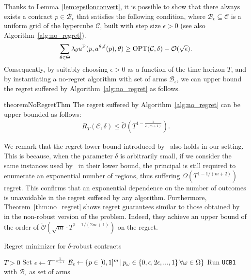Thanks to Lemma~\ref{lem:epsilonconvert}, it is possible to show that there always exists a contract $p \in \mathcal{B}_{\epsilon}$ that satisfies the following condition, where $\mathcal{B}_{\epsilon} \subseteq \mathcal{C}$ is a uniform grid of the hypercube $\mathcal{C}$, built with step size $\epsilon > 0$ (see also Algorithm~\ref{alg:no_regret}).
%
\[ \sum_{\theta \in \Theta} \lambda_\theta  u^{\textnormal{P}}(p,a^{\theta,\delta}(p),\theta) \ge \textnormal{OPT}(\mathcal{C},\delta) - \mathcal{O}( \sqrt{\epsilon}).\]
%
Consequently, by suitably choosing $\epsilon > 0$ as a function of the time horizon $T$, and by instantiating a no-regret algorithm with set of arms $\mathcal{B}_{\epsilon}$, we can upper bound the regret suffered by Algorithm~\ref{alg:no_regret} as follows.
%
\begin{restatable}{theorem}{NoRegretThm}\label{thm:no_regret}
	The regret suffered by Algorithm~\ref{alg:no_regret} can be upper bounded as follows:
	\begin{align*}
		R_T (\mathcal{C},\delta) \le \mathcal{\widetilde{O}} \left(   T^{1- \frac{1}{2(m+1)}}  \right).
	\end{align*}
\end{restatable}
%
We remark that the regret lower bound introduced by~\citet{Zhu2023Sample} also holds in our setting. 
%
This is because, when the parameter $\delta$ is arbitrarily small, if we consider the same instances used by~\citet{Zhu2023Sample} in their lower bound, the principal is still required to enumerate an exponential number of regions, thus suffering $\Omega(T^{1-1/(m+2)})$ regret.
%
This confirms that an exponential dependence on the number of outcomes is unavoidable in the regret suffered by any algorithm.
%
Furthermore, Theorem~\ref{thm:no_regret} shows regret guarantees similar to those obtained by~\citet{Zhu2023Sample} in the non-robust version of the problem.
%
Indeed, they achieve an upper bound of the order of $\widetilde{\mathcal{O}}(\sqrt{m} \cdot T^{1 - 1/(2m+1)})$ on the regret.
%
%
%
%
\begin{algorithm}[!htp]
	\caption{Regret minimizer for $\delta$-robust contracts}
	\label{alg:no_regret}
	\begin{algorithmic}[1]
		\Require $T >0 $
		\State Set $\epsilon\gets T^{-\frac{1}{m+1}}$
		\State $\mathcal{B}_{\epsilon} \hspace{-0.1mm} \gets \hspace{-0.2mm} \left\{ p \in [0,1]^m \, | \, p_\omega \in \{0,\epsilon, 2\epsilon, ..., 1 \} \, \forall \omega \in \Omega \right\} $ 
		\State Run \texttt{UCB1} with $\mathcal{B}_\epsilon $ as set of arms 
	\end{algorithmic}
\end{algorithm}


